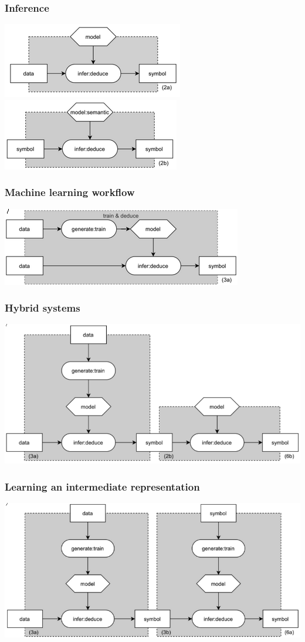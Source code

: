 \documentclass{beamer}
\begin{document}
\begin{frame}
  \frametitle{Inference}
  \centering
  \includegraphics[width=.5\textwidth]{ns4.png}
  \includegraphics[width=.5\textwidth]{ns5.png}
\end{frame}

\begin{frame}
  \frametitle{Machine learning workflow}
  \centering
  \includegraphics[width=.7\textwidth]{ns6.png}
\end{frame}


\begin{frame}
  \frametitle{Hybrid systems}
  \centering
  \includegraphics[width=.7\textwidth]{ns7.png}
\end{frame}

\begin{frame}
  \frametitle{Learning an intermediate representation}
  \centering
  \includegraphics[width=.7\textwidth]{ns8.png}
\end{frame}
\end{document}
